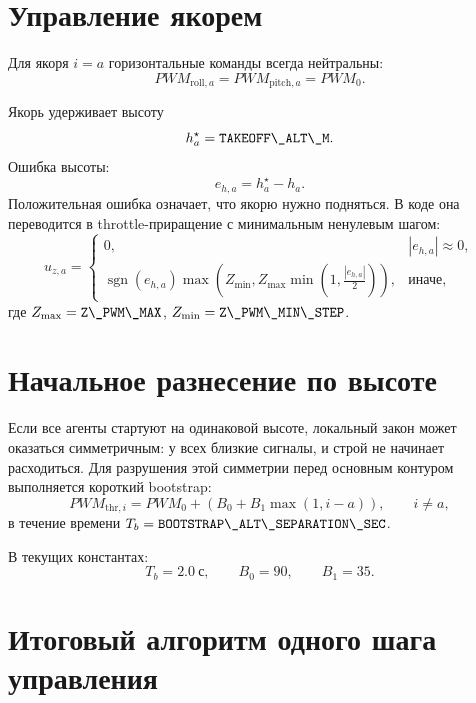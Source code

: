 \documentclass[a4paper,11pt]{article}
\newcommand{\code}[1]{\texttt{\detokenize{#1}}}
\newcommand{\sgn}{\operatorname{sgn}}
\begin{document}
\section{Управление якорем}

Для якоря $i=a$ горизонтальные команды всегда нейтральны:
\[
  PWM_{\mathrm{roll},a}=PWM_{\mathrm{pitch},a}=PWM_0.
\]

Якорь удерживает высоту
\[
  h_a^\star=\text{\code{TAKEOFF\_ALT\_M}}.
\]
Ошибка высоты:
\[
  e_{h,a}=h_a^\star-h_a.
\]
Положительная ошибка означает, что якорю нужно подняться. В коде она
переводится в throttle-приращение с минимальным ненулевым шагом:
\[
  u_{z,a} =
  \begin{cases}
    0, & |e_{h,a}| \approx 0,\\
    \sgn(e_{h,a})
    \max\left(Z_{\min},
      Z_{\max}\min\left(1,\frac{|e_{h,a}|}{2}\right)\right),
    & \text{иначе},
  \end{cases}
\]
где $Z_{\max}=\text{\code{Z\_PWM\_MAX}}$,
$Z_{\min}=\text{\code{Z\_PWM\_MIN\_STEP}}$.

\section{Начальное разнесение по высоте}

Если все агенты стартуют на одинаковой высоте, локальный закон может оказаться
симметричным: у всех близкие сигналы, и строй не начинает расходиться. Для
разрушения этой симметрии перед основным контуром выполняется короткий
bootstrap:
\[
  PWM_{\mathrm{thr},i}
  =
  PWM_0+
  \left(B_0+B_1\max(1,i-a)\right),
  \qquad i\ne a,
\]
в течение времени $T_b=\text{\code{BOOTSTRAP\_ALT\_SEPARATION\_SEC}}$.

В текущих константах:
\[
  T_b=2.0\ \text{с},\qquad B_0=90,\qquad B_1=35.
\]

\section{Итоговый алгоритм одного шага управления}
\end{document}
